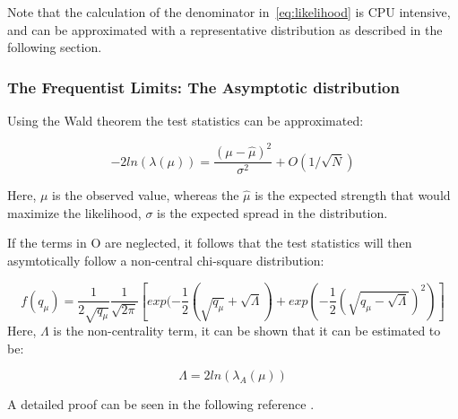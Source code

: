 Note that the calculation of the denominator in~\ref{eq:likelihood} is CPU intensive, and can be approximated with a representative distribution as described in the following section.


\subsubsection{The Frequentist Limits: The Asymptotic distribution}
\label{sec:asymp}


Using the Wald theorem the test statistics can be approximated: 

\begin{equation}
-2ln(\lambda(\mu))= \frac{(\mu- \hat{\mu})^{2}}{\sigma^{2}} +O(1/\sqrt{N})
\label{eq:wald}
\end{equation}

Here, $\mu$ is the observed value, whereas the $\hat{\mu}$ is the expected strength that would maximize the likelihood, $\sigma$ is the expected spread in the distribution. 

If the terms in O are neglected, it follows that the test statistics will then asymtotically follow a non-central chi-square distribution: 

\begin{equation}
    f(q_{\mu}) = \frac{1}{2\sqrt{q_{\mu}}} \frac{1}{\sqrt{2\pi}} [exp(-\frac{1}{2}(\sqrt{q_{\mu}}+ \sqrt{\Lambda})+ exp(-\frac{1}{2}(\sqrt{q_{\mu}-\sqrt{\Lambda}})^{2})]
\end{equation}
Here, $\Lambda$ is the non-centrality term, it can be shown that it can be estimated to be:

\begin{equation}
    \Lambda=2ln(\lambda_{A}(\mu))
    \label{eq:Lambda}
\end{equation}

A detailed proof can be seen in the following reference \cite{2011}. 










